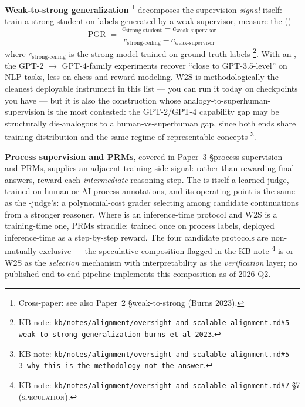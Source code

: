 \textbf{Weak-to-strong generalization}
\citep{burns2023-w2s}\footnote{Cross-paper: see also Paper~2
\S{}weak-to-strong (Burns 2023).} decomposes the supervision
\emph{signal} itself: train a strong student on labels generated by a
weak supervisor, measure the  ()
\[
\mathrm{PGR} \;=\; \frac{c_{\text{strong-student}} - c_{\text{weak-supervisor}}}{c_{\text{strong-ceiling}} - c_{\text{weak-supervisor}}}
\]
where $c_{\text{strong-ceiling}}$ is the strong model trained on
ground-truth labels%
\footnote{KB note: \nolinkurl{kb/notes/alignment/oversight-and-scalable-alignment.md#5-weak-to-strong-generalization-burns-et-al-2023}.}.
With an , the GPT-2 $\to$ GPT-4-family
experiments recover ``close to GPT-3.5-level'' on NLP tasks, less on
chess and reward modeling. W2S is methodologically the cleanest
deployable instrument in this list --- you can run it today on
checkpoints you have --- but it is also the construction whose
analogy-to-superhuman-supervision is the most contested: the
GPT-2/GPT-4 capability gap may be structurally dis-analogous to a
human-vs-superhuman gap, since both ends share training distribution
and the same regime of representable concepts%
\footnote{KB note: \nolinkurl{kb/notes/alignment/oversight-and-scalable-alignment.md#5-3-why-this-is-the-methodology-not-the-answer}.}.

\textbf{Process supervision and PRMs}, covered in Paper~3
\S{}process-supervision-and-PRMs, supplies an adjacent training-side
signal: rather than rewarding final answers, reward each
\emph{intermediate} reasoning step. The  is itself a learned
judge, trained on human or AI process annotations, and its operating
point is the same as the -judge's: a polynomial-cost grader
selecting among candidate continuations from a stronger reasoner.
Where  is an inference-time protocol and W2S is a training-time
one, PRMs straddle: trained once on process labels, deployed
inference-time as a step-by-step reward. The four candidate protocols
are non-mutually-exclusive --- the speculative composition flagged in
the KB note%
\footnote{KB note: \nolinkurl{kb/notes/alignment/oversight-and-scalable-alignment.md#7}
\S 7 (\textsc{speculation}).} is  or W2S as the
\emph{selection} mechanism with interpretability as the
\emph{verification} layer; no published end-to-end pipeline
implements this composition as of 2026-Q2.

